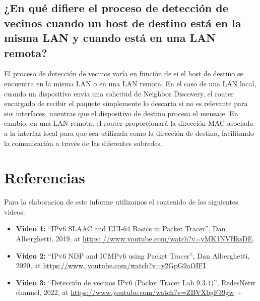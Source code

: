 \documentclass[a4paper,12pt]{article}
\begin{document}
\subsection{¿En qué difiere el proceso de detección de vecinos cuando un host de destino está en la misma LAN y cuando está en una LAN remota? }

El proceso de detección de vecinos varía en función de si el host de destino se encuentra en la misma LAN o en una LAN remota. En el caso de una LAN local, cuando un dispositivo envía una solicitud de Neighbor Discovery, el router encargado de recibir el paquete simplemente lo descarta si no es relevante para sus interfaces, mientras que el dispositivo de destino procesa el mensaje. 
En cambio, en una LAN remota, el router proporcionará la dirección MAC asociada a la interfaz local para que sea utilizada como la dirección de destino, facilitando la comunicación a través de las diferentes subredes.\\


\section{Referencias}
Para la elaboracion de este informe utilizamos el contenido de los siguientes videos. 
\begin{itemize}
  \item \textbf{Video 1:} “IPv6 SLAAC and EUI-64 Basics in Packet Tracer”, Dan Alberghetti, 2019, at \url{https:
  //www.youtube.com/watch?v=yMK1NVHksDE}.
  \item \textbf{Video 2:} “IPv6 NDP and ICMPv6 using Packet Tracer”, Dan Alberghetti, 2020, at \url{https://www.
  youtube.com/watch?v=y2GpG9aOIFI}
  \item \textbf{Video 3:} “Detección de vecinos IPv6 (Packet Tracer Lab 9.3.4)”, RedesNetw channel, 2022, at \url{https://www.youtube.com/watch?v=ZBVXbgF39gw}
+\end{itemize}
\end{document}
